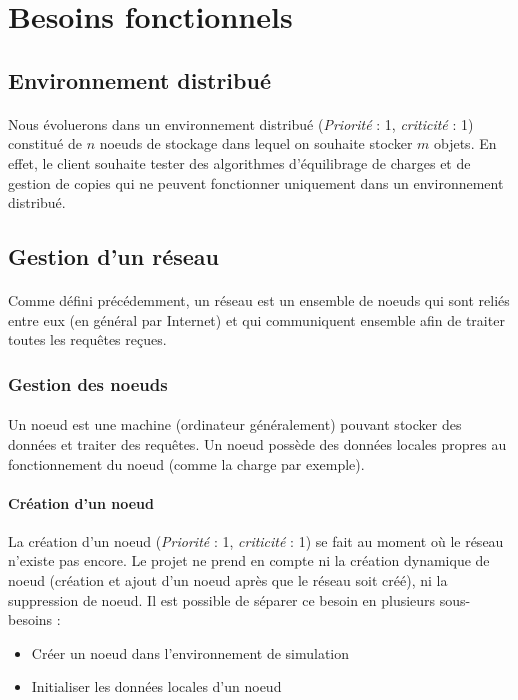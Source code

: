 \documentclass[12pt]{article}
\newcommand{\besoin}[2] {
  (\textit{Priorité} : #1, \textit{criticité} : #2)
}
\begin{document}
\newpage

\section{Besoins fonctionnels}


\subsection{Environnement distribué}

\paragraph{} Nous évoluerons dans un environnement distribué \besoin{1}{1} constitué de $n$ noeuds de stockage dans lequel on souhaite stocker $m$ objets.
En effet, le client souhaite tester des algorithmes d'équilibrage de charges et de gestion de copies qui ne peuvent fonctionner uniquement dans un environnement distribué.


\subsection{Gestion d'un réseau}

\paragraph{} Comme défini précédemment, un réseau est un ensemble de noeuds qui sont reliés entre eux (en général par Internet) et qui communiquent ensemble afin de traiter toutes les requêtes reçues.


\subsubsection{Gestion des noeuds}

\paragraph{} Un noeud est une machine (ordinateur généralement) pouvant stocker des données et traiter des requêtes. Un noeud possède des données locales propres au fonctionnement du noeud (comme la charge par exemple).

\paragraph{Création d'un noeud} La création d'un noeud \besoin{1}{1} se fait au moment où le réseau n'existe pas encore. 
Le projet ne prend en compte ni la création dynamique de noeud (création et ajout d'un noeud après que le réseau soit créé), ni la suppression de noeud. 
Il est possible de séparer ce besoin en plusieurs sous-besoins :
 \begin{itemize}
 	\item Créer un noeud dans l'environnement de simulation
 	\item Initialiser les données locales d'un noeud
 \end{itemize}
 
\end{document}
